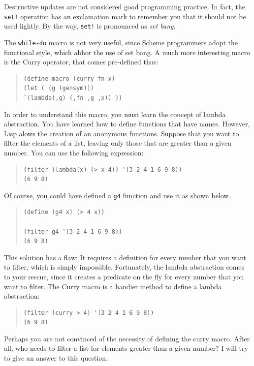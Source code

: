 \documentclass[a4paper,12pt]{book}
\begin{document}
Destructive updates are not
considered good programming practice.
In fact, the \verb|set!| operation has
an exclamation mark to remember you
that it should not be used lightly.
By the way, \verb|set!|
is pronounced as {\em set bang}.

The \verb|while-do| macro is not very useful,
since Scheme programmers adopt the functional
style, which abhor the use of set bang.
A much more interesting macro is the
Curry operator, that comes pre-defined thus:
\begin{quote}\label{page:lambda2}
\begin{verbatim}
(define-macro (curry fn x)
(let ( (g (gensym)))
`(lambda(,g) (,fn ,g ,x)) ))
\end{verbatim}
\end{quote}
In order to understand this macro, you
must learn the concept of lambda abstraction.
You have learned how to define functions
that have names. However,
Lisp alows the creation of
an anonymous functions.
Suppose that you want to filter the
elements of a list, leaving only those
that are greater than a given number.
You can use the following expression:
\begin{quote}
\begin{verbatim}
(filter (lambda(x) (> x 4)) '(3 2 4 1 6 9 8))
(6 9 8)
\end{verbatim}
\end{quote}
Of course, you could have defined a 
\verb|g4| function and use it as shown below.
\begin{quote}
\begin{verbatim}
(define (g4 x) (> 4 x))

(filter g4 '(3 2 4 1 6 9 8))
(6 9 8)
\end{verbatim}
\end{quote}
This solution has a flaw: It requires a
definition for every number that you
want to filter, which is simply impossible.
Fortunately, the lambda abstraction comes
to your rescue, since it 
creates a predicate on the fly for every
number that you want to filter. The Curry
macro is a handier method to define a lambda
abstraction:
\begin{quote}
\begin{verbatim}
(filter (curry > 4) '(3 2 4 1 6 9 8))
(6 9 8)
\end{verbatim}
\end{quote}

Perhaps you are not convinced of the
necessity of defining the curry macro.
After all, who  needs to filter a list
for elements greater than a given number?
I will try to give an answer to this
question.
\end{document}

